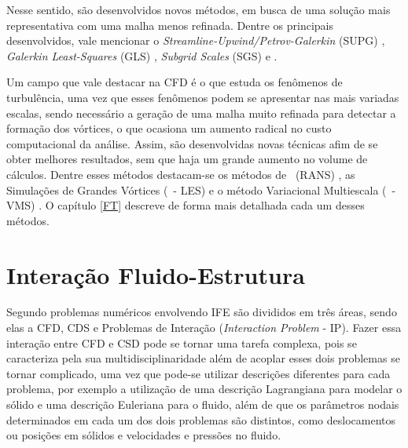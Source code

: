Nesse sentido, são desenvolvidos novos métodos, em busca de uma solução mais representativa com uma malha menos refinada. Dentre os principais desenvolvidos, vale mencionar o \textit{Streamline-Upwind/Petrov-Galerkin} (SUPG) \cite{brooks1982streamline}, \textit{Galerkin Least-Squares} (GLS) \cite{hughes1989new,tezduyar1991stabilized}, \textit{Subgrid Scales} (SGS) e \cite{hughes1995multiscale}.

Um campo que vale destacar na CFD é o que estuda os fenômenos de turbulência, uma vez que esses fenômenos podem se apresentar nas mais variadas escalas, sendo necessário a geração de uma malha muito refinada para detectar a formação dos vórtices, o que ocasiona um aumento radical no custo computacional da análise. Assim, são desenvolvidas novas técnicas afim de se obter melhores resultados, sem que haja um grande aumento no volume de cálculos. Dentre esses métodos destacam-se os métodos de \RANS\ (RANS) \cite{speziale1991analytical,alfonsi2009reynolds,ling2015evaluation}, as Simulações de Grandes Vórtices (\LES\ - LES) \cite{germano1991dynamic,piomelli1999large,hughes2000large,vsekutkovski2021partitioned} e o método Variacional Multiescala (\VMS\ - VMS) \cite{hughes1995multiscale,hughes1998variational,hughes2002variational,bazilevs2010large,bazilevs2013computational}. O capítulo \ref{FT} descreve de forma mais detalhada cada um desses métodos.


\section{Interação Fluido-Estrutura} \label{IFE}

Segundo  problemas numéricos envolvendo IFE são divididos em três áreas, sendo elas a CFD, CDS e Problemas de Interação (\textit{Interaction Problem} - IP). Fazer essa interação entre CFD e CSD pode se tornar uma tarefa complexa, pois se caracteriza pela sua multidisciplinaridade \cite{hou2012numerical} além de acoplar esses dois problemas se tornar complicado, uma vez que pode-se utilizar descrições diferentes para cada problema, por exemplo a utilização de uma descrição Lagrangiana para modelar o sólido e uma descrição Euleriana para o fluido, além de que os parâmetros nodais determinados em cada um dos dois problemas são distintos, como deslocamentos ou posições em sólidos e velocidades e pressões no fluido.

